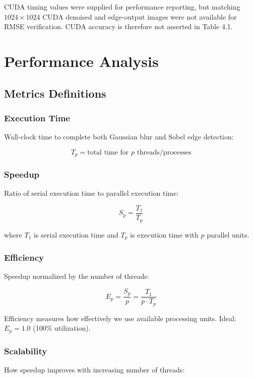 \documentclass[12pt,a4paper]{report}
\begin{document}
CUDA timing values were supplied for performance reporting, but matching $1024 \times 1024$
CUDA denoised and edge-output images were not available for RMSE verification. CUDA accuracy
is therefore not asserted in Table 4.1.

\newpage

\chapter{Performance Analysis}

\section{Metrics Definitions}

\subsection{Execution Time}
Wall-clock time to complete both Gaussian blur and Sobel edge detection:

\begin{equation}
T_p = \text{total time for } p \text{ threads/processes}
\end{equation}

\subsection{Speedup}
Ratio of serial execution time to parallel execution time:

\begin{equation}
S_p = \frac{T_1}{T_p}
\end{equation}

where $T_1$ is serial execution time and $T_p$ is execution time with $p$ parallel units.

\subsection{Efficiency}
Speedup normalized by the number of threads:

\begin{equation}
E_p = \frac{S_p}{p} = \frac{T_1}{p \cdot T_p}
\end{equation}

Efficiency measures how effectively we use available processing units. Ideal: $E_p = 1.0$ (100\% utilization).

\subsection{Scalability}
How speedup improves with increasing number of threads:
\end{document}
